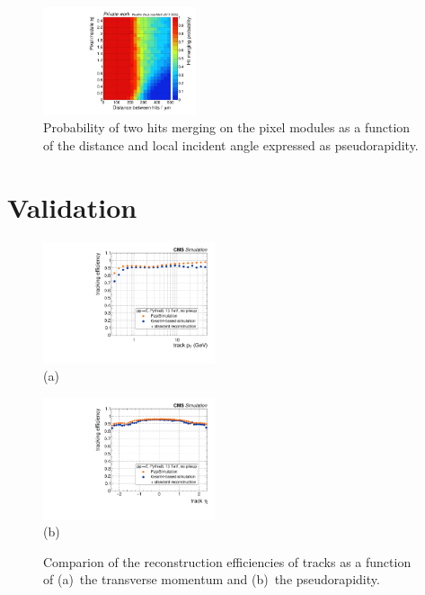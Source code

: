 \documentclass[a4paper]{jpconf}
\begin{document}
\begin{figure}[htbp]
\begin{center}
\includegraphics[width=0.4\textwidth]{figures/merge.pdf}
\caption{Probability of two hits merging on the pixel modules as a function of the distance and local incident angle expressed as pseudorapidity.}
\end{center}
\end{figure}

\section{Validation}

\begin{figure}[htbp]
\begin{center}
\parbox{0.46\textwidth}{\centering\includegraphics[width=0.45\textwidth]{figures/eff_pt.pdf}\\(a)}
\hspace{0.05\textwidth}
\parbox{0.46\textwidth}{\centering\includegraphics[width=0.45\textwidth]{figures/eff_eta.pdf}\\(b)}
\caption{Comparion of the reconstruction efficiencies of tracks as a function of (a)~the transverse momentum and (b)~the pseudorapidity.}
\end{center}
\end{figure}
\end{document}
